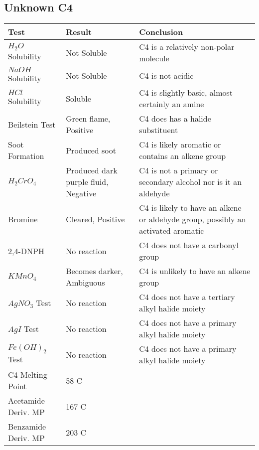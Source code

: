\documentclass{article}
\begin{document}
	\subsection{Unknown C4}
	\begin{table}[h]
		
		\begin{tabular}{ l  p{3.0cm} p{5.4cm} } 
			\toprule
			\textbf{Test} & \textbf{Result} & \textbf{Conclusion} \\\midrule
			
			$H_2O$ Solubility & Not Soluble & C4 is a relatively non-polar molecule \\\hline
			
			$NaOH$ Solubility & Not Soluble & C4 is not acidic \\\hline
			
			$HCl$ Solubility & Soluble & C4 is slightly basic, almost certainly an amine \\\hline
			
			Beilstein Test & Green flame, Positive & C4 does has a halide substituent \\\hline
			
			Soot Formation & Produced soot & C4 is likely aromatic or contains an alkene group \\\hline
			
			$H_2CrO_4$ & Produced dark purple fluid, Negative & C4 is not a primary or secondary alcohol nor is it an aldehyde \\\hline
			
			Bromine & Cleared, Positive & C4 is likely to have an alkene or aldehyde group, possibly an activated aromatic \\\hline 
			
			2,4-DNPH & No reaction & C4 does not have a carbonyl group \\\hline 
			
			$KMnO_4$ & Becomes darker, Ambiguous & C4 is unlikely to have an alkene group \\\hline  
			
			$AgNO_3$ Test & No reaction & C4 does not have a tertiary alkyl halide moiety \\\hline 
			
			$AgI$ Test & No reaction & C4 does not have a primary alkyl halide moiety \\\hline 
			
			$Fe(OH)_2$ Test & No reaction & C4 does not have a primary alkyl halide moiety \\\hline
			
			C4 Melting Point & 58 C &  \\\hline
			
			Acetamide Deriv. MP & 167 C &  \\\hline
			
			Benzamide Deriv. MP & 203 C &  \\\hline
			
		\end{tabular}
	\end{table}
	
\end{document}
